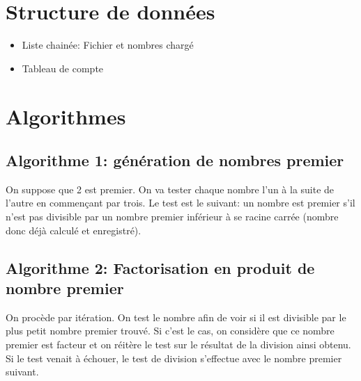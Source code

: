 \documentclass[11pt,a4paper]{article}
\begin{document}
\section*{Structure de données}
\begin{itemize}
\item{Liste chainée: Fichier et nombres chargé}
\item{Tableau de compte}
\end{itemize}

\section*{Algorithmes}
 \subsection*{Algorithme 1: génération de nombres premier}
 
 On suppose que 2 est premier. On va tester chaque nombre l'un à la suite de l'autre en commençant par trois. Le test est le suivant: un nombre est premier s'il n'est pas divisible par un nombre premier inférieur à se racine carrée (nombre donc déjà calculé et enregistré).
 
 \subsection*{Algorithme 2: Factorisation en produit de nombre premier}   
 
 On procède par itération. On test le nombre afin de voir si il est divisible par le plus petit nombre premier trouvé. Si c'est le cas, on considère que ce nombre premier est facteur et on réitère le test sur le résultat de la division ainsi obtenu. Si le test venait à échouer, le test de division s'effectue avec le nombre premier suivant. 
\end{document}
